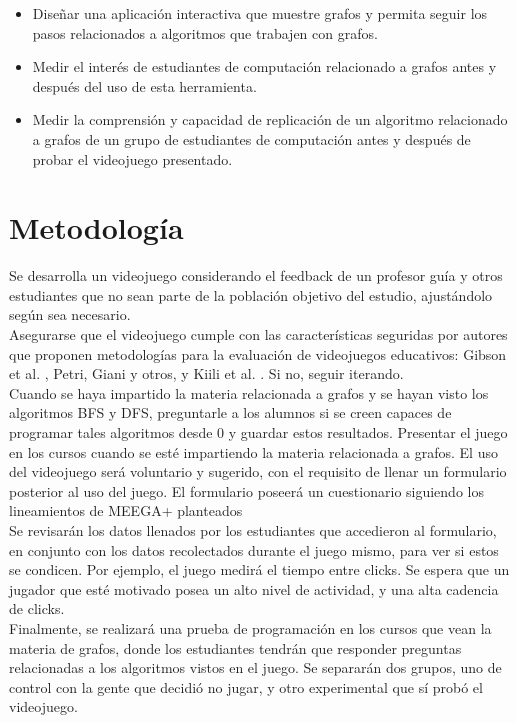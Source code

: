 \documentclass[submission]{eptcs}
\begin{document}
\begin{itemize}
\item Diseñar una aplicación interactiva que muestre grafos y permita seguir
los pasos relacionados a algoritmos que trabajen con grafos.

\item Medir el interés de estudiantes de computación relacionado a grafos
antes y después del uso de esta herramienta.

\item Medir la comprensión y capacidad de replicación de un algoritmo relacionado a grafos
de un grupo de estudiantes de computación antes y después de probar el videojuego presentado.

\end{itemize}

\section{Metodología}


Se desarrolla un videojuego considerando el feedback de un profesor guía y otros estudiantes
que no sean parte de la población objetivo del estudio, ajustándolo según sea necesario. \\
Asegurarse que el videojuego cumple con las características seguridas por autores que proponen metodologías para la evaluación de videojuegos educativos: Gibson et al. \cite{evaluation_of_games_for_teaching_cs},
Petri, Giani y otros, \cite{petri2018method} y Kiili et al. \cite{using_videogames_maths}. Si no, seguir iterando. \\
Cuando se haya impartido la materia relacionada a grafos y se hayan visto los algoritmos BFS y DFS, preguntarle a
los alumnos si se creen capaces de programar tales algoritmos desde 0 y guardar estos resultados.
Presentar el juego en los cursos cuando se esté impartiendo la materia relacionada a grafos. El uso del
videojuego será voluntario y sugerido, con el requisito de llenar un formulario posterior al uso del juego.
El formulario poseerá un cuestionario siguiendo los lineamientos de MEEGA+ planteados \cite{petri2018meegaplus} \\
Se revisarán los datos llenados por los estudiantes que accedieron al formulario, en conjunto con los
datos recolectados durante el juego mismo, para ver si estos se condicen. Por ejemplo, el juego medirá el tiempo
entre clicks. Se espera que un jugador que esté motivado posea un alto nivel de actividad, y una alta cadencia de clicks. \\
Finalmente, se realizará una prueba de programación en los cursos que vean la materia de grafos, donde los estudiantes
tendrán que responder preguntas relacionadas a los algoritmos vistos en el juego. Se separarán dos grupos, 
uno de control con la gente que decidió no jugar, y otro experimental que sí probó el videojuego.
\end{document}
